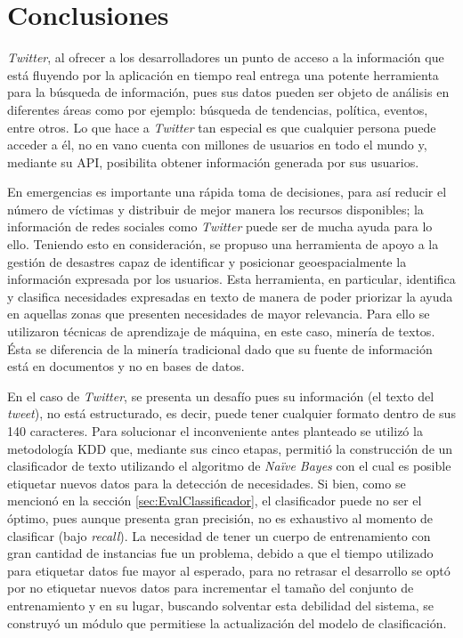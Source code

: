 \chapter{Conclusiones}
\label{cap:conclusiones}

\textit{Twitter}, al ofrecer a los desarrolladores un punto de acceso a la información que está fluyendo por la aplicación en tiempo real entrega una potente herramienta para la búsqueda de información, pues sus datos pueden ser objeto de análisis en diferentes áreas como por ejemplo: búsqueda de tendencias, política, eventos, entre otros. Lo que hace a \textit{Twitter} tan especial es que cualquier persona puede acceder a él, no en vano cuenta con millones de usuarios en todo el mundo y, mediante su API, posibilita obtener información generada por sus usuarios. 

En emergencias es importante una rápida toma de decisiones, para así reducir el número de víctimas y distribuir de mejor manera los recursos disponibles; la información de redes sociales como \textit{Twitter} puede ser de mucha ayuda para lo ello. Teniendo esto en consideración, se propuso una herramienta de apoyo a la gestión de desastres capaz de identificar y posicionar geoespacialmente la información expresada por los usuarios. Esta herramienta, en particular, identifica y clasifica necesidades expresadas en texto de manera de poder priorizar la ayuda en aquellas zonas que presenten necesidades de mayor relevancia. Para ello se utilizaron técnicas de aprendizaje de máquina, en este caso, minería de textos. Ésta se diferencia de la minería tradicional dado que su fuente de información está en documentos y no en bases de datos. 

En el caso de \textit{Twitter}, se presenta un desafío pues su información (el texto del \textit{tweet}), no está estructurado, es decir, puede tener cualquier formato dentro de sus 140 caracteres. Para solucionar el inconveniente antes planteado se utilizó la metodología KDD que, mediante sus cinco etapas, permitió la construcción de un clasificador de texto utilizando el algoritmo de \textit{Naïve Bayes} con el cual es posible etiquetar nuevos datos para la detección de necesidades. Si bien, como se mencionó en la sección \ref{sec:EvalClassificador}, el clasificador puede no ser el óptimo, pues aunque presenta gran precisión, no es exhaustivo al momento de clasificar (bajo \textit{recall}). La necesidad de tener un cuerpo de entrenamiento con gran cantidad de instancias fue un problema, debido a que el tiempo utilizado para etiquetar datos fue mayor al esperado, para no retrasar el desarrollo se optó por no etiquetar nuevos datos para incrementar el tamaño del conjunto de entrenamiento y en su lugar, buscando solventar esta debilidad del sistema, se construyó un módulo que permitiese la actualización del modelo de clasificación.

